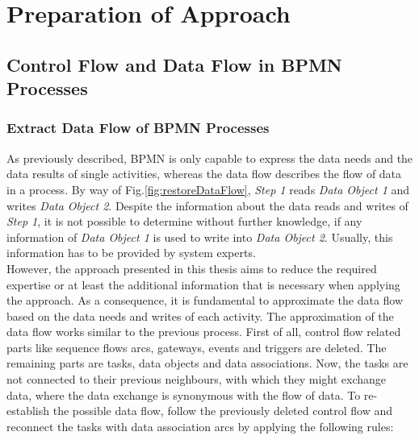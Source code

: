 \chapter{Preparation of Approach}
\label{ch:PrepApproach}











\section{Control Flow and Data Flow in BPMN Processes}
\label{ch:PrepApproach:ControlDataFlowBPMNProcess}
 


\subsection{Extract Data Flow of BPMN Processes}

As previously described, BPMN is only capable to express the data needs and the data results of single activities, whereas the data flow describes the flow of data in a process. By way of Fig.\ref{fig:restoreDataFlow}, \textit{Step 1} reads \textit{Data Object 1} and writes \textit{Data Object 2}. Despite the information about the data reads and writes of \textit{Step 1}, it is not possible to determine without further knowledge, if any information of \textit{Data Object 1} is used to write into \textit{Data Object 2}. Usually, this information has to be provided by system experts. \\
However, the approach presented in this thesis aims to reduce the required expertise or at least the additional information that is necessary when applying the approach. 
As a consequence, it is fundamental to approximate the data flow based on the data needs and writes of each activity. The approximation of the data flow works similar to the previous process. First of all, control flow related parts like sequence flows arcs, gateways, events and triggers are deleted. The remaining parts are tasks, data objects and data associations. Now, the tasks are not connected to their previous neighbours, with which they might exchange data, where the data exchange is synonymous with the flow of data.
To re-establish the possible data flow, follow the previously deleted control flow and reconnect the tasks with data association arcs by applying the following rules:











